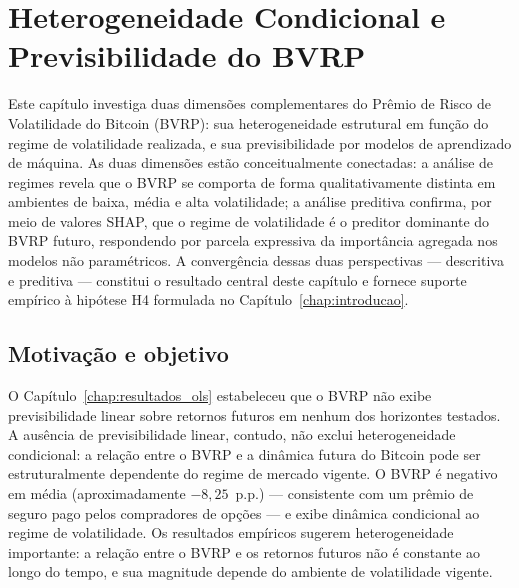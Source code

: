 
\chapter{Heterogeneidade Condicional e Previsibilidade do BVRP}
\label{chap:cap6_fusao}
\label{chap:cap5_ml}
\label{chap:regimes}

Este capítulo investiga duas dimensões complementares do Prêmio
de Risco de Volatilidade do Bitcoin (BVRP): sua heterogeneidade
estrutural em função do regime de volatilidade realizada, e sua
previsibilidade por modelos de aprendizado de máquina. As duas
dimensões estão conceitualmente conectadas: a análise de regimes
revela que o BVRP se comporta de forma qualitativamente distinta
em ambientes de baixa, média e alta volatilidade; a análise
preditiva confirma, por meio de valores SHAP, que o regime de
volatilidade é o preditor dominante do BVRP futuro, respondendo
por parcela expressiva da importância agregada nos modelos não
paramétricos. A convergência dessas duas perspectivas --- descritiva
e preditiva --- constitui o resultado central deste capítulo e
fornece suporte empírico à hipótese H4 formulada no
Capítulo~\ref{chap:introducao}.

\section{Motivação e objetivo}
\label{sec:cap6_motivacao}

O Capítulo~\ref{chap:resultados_ols} estabeleceu que o BVRP não exibe
previsibilidade linear sobre retornos futuros em nenhum dos horizontes
testados. A ausência de previsibilidade linear, contudo, não exclui
heterogeneidade condicional: a relação entre o BVRP e a dinâmica futura
do Bitcoin pode ser estruturalmente dependente do regime de mercado
vigente. O BVRP é negativo em média (aproximadamente $-8{,}25$~p.p.) ---
consistente com um prêmio de seguro pago pelos compradores de opções ---
e exibe dinâmica condicional ao regime de volatilidade. Os resultados
empíricos sugerem heterogeneidade importante: a relação entre o BVRP e
os retornos futuros não é constante ao longo do tempo, e sua magnitude
depende do ambiente de volatilidade vigente.

